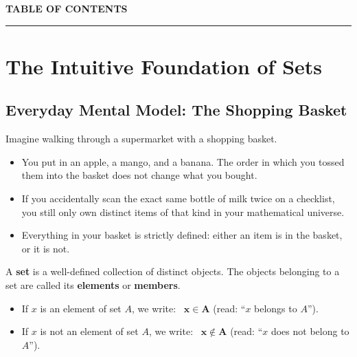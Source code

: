 \documentclass[11pt,a4paper]{article}
\begin{document}
\begin{center}
{\color{navy}\bfseries\Large\MakeUppercase{Table of Contents}}\\[-3pt]
{\color{gold}\rule{\linewidth}{1.2pt}}
\end{center}
\vspace{4pt}

\begingroup
\hypersetup{linkcolor=navy}
\setcounter{tocdepth}{2}
\makeatletter
{}
\makeatother
\endgroup

\newpage




\section{The Intuitive Foundation of Sets}

\subsection{Everyday Mental Model: The Shopping Basket}
Imagine walking through a supermarket with a shopping basket. 
\begin{itemize}
    \item You put in an apple, a mango, and a banana. The order in which you tossed them into the basket does not change what you bought.
    \item If you accidentally scan the exact same bottle of milk twice on a checklist, you still only own distinct items of that kind in your mathematical universe.
    \item Everything in your basket is strictly defined: either an item is in the basket, or it is not.
\end{itemize}

\begin{defbox}
A \textbf{set} is a well-defined collection of distinct objects. The objects belonging to a set are called its \textbf{elements} or \textbf{members}.
\begin{itemize}
    \item If $x$ is an element of set $A$, we write: \ $\mathbf{x \in A}$ \quad (read: ``$x$ belongs to $A$'').
    \item If $x$ is not an element of set $A$, we write: \ $\mathbf{x \notin A}$ \quad (read: ``$x$ does not belong to $A$'').
\end{itemize}
\end{defbox}
\end{document}

